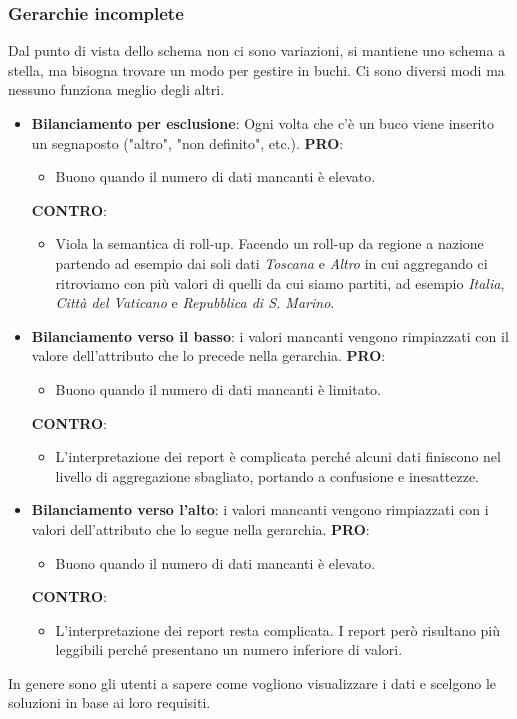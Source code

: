 \subsubsection{Gerarchie incomplete}
Dal punto di vista dello schema non ci sono variazioni, si mantiene uno schema a stella, ma bisogna trovare un modo per gestire in buchi. Ci sono diversi modi ma nessuno funziona meglio degli altri.
\begin{itemize}
	\item \textbf{Bilanciamento per esclusione}: Ogni volta che c'è un buco viene inserito un segnaposto ("altro", "non definito", etc.).
	\textbf{PRO}:
	\begin{itemize}
		\item Buono quando il numero di dati mancanti è elevato.
	\end{itemize}
	\textbf{CONTRO}:
	\begin{itemize}
		\item Viola la semantica di roll-up. Facendo un roll-up da regione a nazione partendo ad esempio dai soli dati \textit{Toscana} e \textit{Altro} in cui aggregando ci ritroviamo con più valori di quelli da cui siamo partiti, ad esempio \textit{Italia}, \textit{Città del Vaticano} e \textit{Repubblica di S. Marino}.
	\end{itemize}
	\item \textbf{Bilanciamento verso il basso}: i valori mancanti vengono rimpiazzati con il valore dell'attributo che lo precede nella gerarchia.
	\textbf{PRO}:
	\begin{itemize}
		\item Buono quando il numero di dati mancanti è limitato.
	\end{itemize}
	\textbf{CONTRO}:
	\begin{itemize}
		\item L'interpretazione dei report è complicata perché alcuni dati finiscono nel livello di aggregazione sbagliato, portando a confusione e inesattezze.
	\end{itemize}
	\item \textbf{Bilanciamento verso l'alto}: i valori mancanti vengono rimpiazzati con i valori dell'attributo che lo segue nella gerarchia.
	\textbf{PRO}:
	\begin{itemize}
		\item Buono quando il numero di dati mancanti è elevato.
	\end{itemize}
	\textbf{CONTRO}:
	\begin{itemize}
		\item L'interpretazione dei report resta complicata. I report però risultano più leggibili perché presentano un numero inferiore di valori.
	\end{itemize}
\end{itemize}
In genere sono gli utenti a sapere come vogliono visualizzare i dati e scelgono le soluzioni in base ai loro requisiti.
